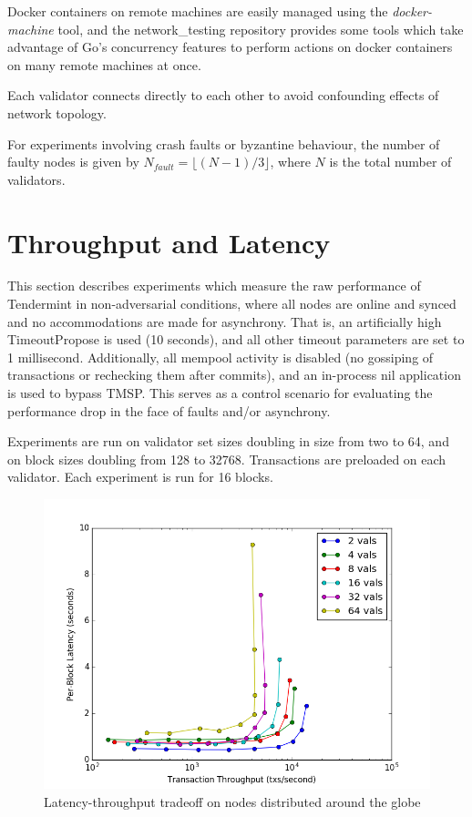 Docker containers on remote machines are easily managed using the \emph{docker-machine} tool, 
and the network\_testing repository provides some tools which take advantage of Go's concurrency features
to perform actions on docker containers on many remote machines at once.

Each validator connects directly to each other to avoid confounding effects of network topology.

For experiments involving crash faults or byzantine behaviour, the number of faulty nodes is given by $N_{fault} = \lfloor(N-1)/3\rfloor$,
where $N$ is the total number of validators.

\section{Throughput and Latency}

This section describes experiments which measure the raw performance of Tendermint in non-adversarial conditions,
where all nodes are online and synced and no accommodations are made for asynchrony.
That is, an artificially high TimeoutPropose is used (10 seconds), and all other timeout parameters are set to 1 millisecond.
Additionally, all mempool activity is disabled (no gossiping of transactions or rechecking them after commits),
and an in-process nil application is used to bypass TMSP.
This serves as a control scenario for evaluating the performance drop in the face of faults and/or asynchrony.

Experiments are run on validator set sizes doubling in size from two to 64, and on block sizes doubling from 128 to 32768.
Transactions are preloaded on each validator. Each experiment is run for 16 blocks. 


\begin{figure}[]
	\includegraphics[width=\linewidth,height=\textheight,keepaspectratio]{figures/throughput/latency-throughput.png}
    	\centering
	\caption[Latency-throughput in non-faulty network]{Latency-throughput tradeoff on nodes distributed around the globe}
	\label{fig:exp_throughput_latency}
\end{figure}


